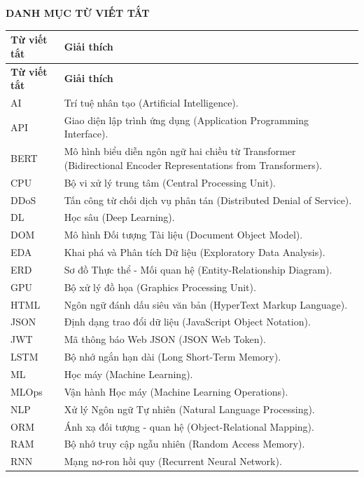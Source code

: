 \documentclass[12pt,a4paper]{article}
\begin{document}
\begin{center}{\bfseries\Large DANH MỤC TỪ VIẾT TẮT}\end{center}
\vspace{0.35cm}
\begingroup
\renewcommand{\theHtable}{frontabbr}
\begin{longtable}{L{0.20\textwidth}L{0.70\textwidth}}
\toprule
\textbf{Từ viết tắt} & \textbf{Giải thích}\\
\midrule
\endfirsthead
\toprule
\textbf{Từ viết tắt} & \textbf{Giải thích}\\
\midrule
\endhead
AI & Trí tuệ nhân tạo (Artificial Intelligence).\\
API & Giao diện lập trình ứng dụng (Application Programming Interface).\\
BERT & Mô hình biểu diễn ngôn ngữ hai chiều từ Transformer (Bidirectional Encoder Representations from Transformers).\\
CPU & Bộ vi xử lý trung tâm (Central Processing Unit).\\
DDoS & Tấn công từ chối dịch vụ phân tán (Distributed Denial of Service).\\
DL & Học sâu (Deep Learning).\\
DOM & Mô hình Đối tượng Tài liệu (Document Object Model).\\
EDA & Khai phá và Phân tích Dữ liệu (Exploratory Data Analysis).\\
ERD & Sơ đồ Thực thể - Mối quan hệ (Entity-Relationship Diagram).\\
GPU & Bộ xử lý đồ họa (Graphics Processing Unit).\\
HTML & Ngôn ngữ đánh dấu siêu văn bản (HyperText Markup Language).\\
JSON & Định dạng trao đổi dữ liệu (JavaScript Object Notation).\\
JWT & Mã thông báo Web JSON (JSON Web Token).\\
LSTM & Bộ nhớ ngắn hạn dài (Long Short-Term Memory).\\
ML & Học máy (Machine Learning).\\
MLOps & Vận hành Học máy (Machine Learning Operations).\\
NLP & Xử lý Ngôn ngữ Tự nhiên (Natural Language Processing).\\
ORM & Ánh xạ đối tượng - quan hệ (Object-Relational Mapping).\\
RAM & Bộ nhớ truy cập ngẫu nhiên (Random Access Memory).\\
RNN & Mạng nơ-ron hồi quy (Recurrent Neural Network).\\

\end{longtable}
\end{document}
